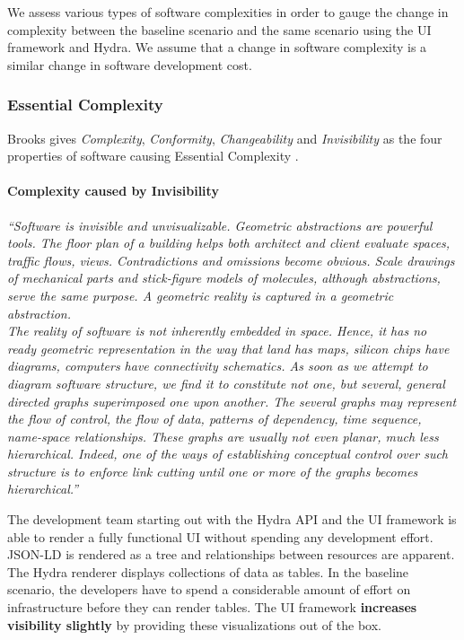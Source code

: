 We assess various types of software complexities in order to gauge the change in complexity between the baseline scenario and the same scenario using the UI framework and Hydra. We assume that a change in software complexity is a similar change in software development cost.

\subsubsection{Essential Complexity}
Brooks gives \textit{Complexity}, \textit{Conformity}, \textit{Changeability} and \textit{Invisibility} as the four properties of software causing Essential Complexity \citep{nosilverbullet}.

\paragraph{Complexity caused by Invisibility}
\textit{``Software is invisible and unvisualizable. Geometric abstractions are powerful tools. The floor plan of a building helps both architect and client evaluate spaces, traffic flows, views. Contradictions and omissions become obvious. Scale drawings of mechanical parts and stick-figure models of molecules, although abstractions, serve the same purpose. A geometric reality is captured in a geometric abstraction. \\ The reality of software is not inherently embedded in space. Hence, it has no ready geometric representation in the way that land has maps, silicon chips have diagrams, computers have connectivity schematics. As soon as we attempt to diagram software structure, we find it to constitute not one, but several, general directed graphs superimposed one upon another. The several graphs may represent the flow of control, the flow of data, patterns of dependency, time sequence, name-space relationships. These graphs are usually not even planar, much less hierarchical. Indeed, one of the ways of establishing conceptual control over such structure is to enforce link cutting until one or more of the graphs becomes hierarchical.''} \citep[p.~4]{nosilverbullet}

The development team starting out with the Hydra API and the UI framework is able to render a fully functional UI without spending any development effort. JSON-LD is rendered as a tree and relationships between resources are apparent. The Hydra renderer displays collections of data as tables. In the baseline scenario, the developers have to spend a considerable amount of effort on infrastructure before they can render tables. The UI framework \textbf{increases visibility slightly} by providing these visualizations out of the box.

